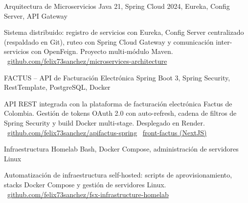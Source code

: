 \documentclass[]{awesome-cv}
\begin{document}
\begin{cventries}
	\vspace{-3mm}
	\cventry
	{}
	{Arquitectura de Microservicios \vspace{-5mm}}
	{Java 21, Spring Cloud 2024, Eureka, Config Server, API Gateway \vspace{-5mm}}
	{}
	{\begin{cvsectionnormaltext}
		\item {Sistema distribuido: registro de servicios con Eureka, Config Server centralizado (respaldado en Git), ruteo con Spring Cloud Gateway y comunicaci\'{o}n inter-servicios con OpenFeign. Proyecto multi-m\'{o}dulo Maven.
		\newline \faGithubSquare\ \href{https://github.com/felix73sanchez/microservices-architecture}{github.com/felix73sanchez/microservices-architecture}}
	\end{cvsectionnormaltext}}

	\vspace{-3mm}
	\cventry
	{}
	{FACTUS -- API de Facturaci\'{o}n Electr\'{o}nica \vspace{-5mm}}
	{Spring Boot 3, Spring Security, RestTemplate, PostgreSQL, Docker \vspace{-5mm}}
	{}
	{\begin{cvsectionnormaltext}
		\item {API REST integrada con la plataforma de facturaci\'{o}n electr\'{o}nica Factus de Colombia. Gesti\'{o}n de tokens OAuth 2.0 con auto-refresh, cadena de filtros de Spring Security y build Docker multi-stage. Desplegado en Render.
		\newline \faGithubSquare\ \href{https://github.com/felix73sanchez/apifactus-spring}{github.com/felix73sanchez/apifactus-spring}
		\hspace{1mm} \faGithubSquare\ \href{https://github.com/felix73sanchez/front-factus}{front-factus (NextJS)}}
	\end{cvsectionnormaltext}}

	\vspace{-3mm}
	\cventry
	{}
	{Infraestructura Homelab \vspace{-5mm}}
	{Bash, Docker Compose, administraci\'{o}n de servidores Linux \vspace{-5mm}}
	{}
	{\begin{cvsectionnormaltext}
		\item {Automatizaci\'{o}n de infraestructura self-hosted: scripts de aprovisionamiento, stacks Docker Compose y gesti\'{o}n de servidores Linux.
		\newline \faGithubSquare\ \href{https://github.com/felix73sanchez/fsx-infrastructure-homelab}{github.com/felix73sanchez/fsx-infrastructure-homelab}}
	\end{cvsectionnormaltext}}

	\vspace{-5mm}

\end{cventries}
\end{document}

